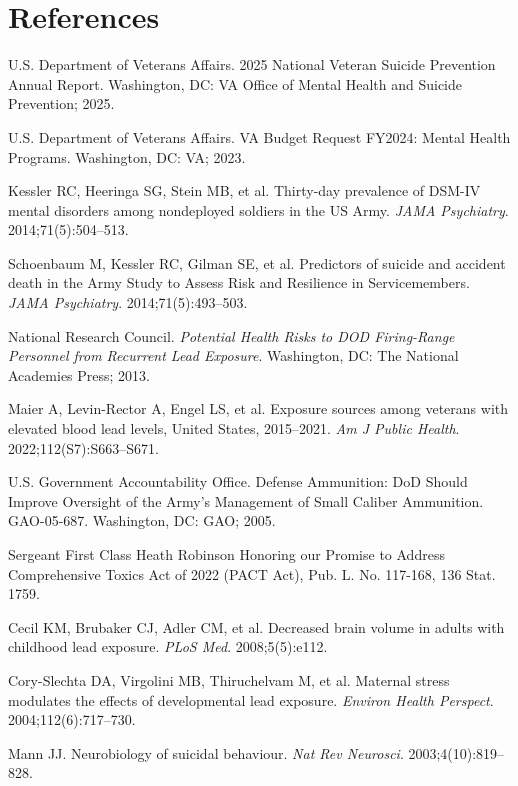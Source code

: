 \documentclass[11pt,twocolumn]{article}
\begin{document}
\section*{References}
{\small
\begin{enumerate}[label={[\arabic*]}, leftmargin=*, itemsep=1pt]
    \item U.S. Department of Veterans Affairs. 2025 National Veteran Suicide Prevention Annual Report. Washington, DC: VA Office of Mental Health and Suicide Prevention; 2025.
    \item U.S. Department of Veterans Affairs. VA Budget Request FY2024: Mental Health Programs. Washington, DC: VA; 2023.
    \item Kessler RC, Heeringa SG, Stein MB, et al. Thirty-day prevalence of DSM-IV mental disorders among nondeployed soldiers in the US Army. \textit{JAMA Psychiatry}. 2014;71(5):504--513.
    \item Schoenbaum M, Kessler RC, Gilman SE, et al. Predictors of suicide and accident death in the Army Study to Assess Risk and Resilience in Servicemembers. \textit{JAMA Psychiatry}. 2014;71(5):493--503.
    \item National Research Council. \textit{Potential Health Risks to DOD Firing-Range Personnel from Recurrent Lead Exposure}. Washington, DC: The National Academies Press; 2013.
    \item Maier A, Levin-Rector A, Engel LS, et al. Exposure sources among veterans with elevated blood lead levels, United States, 2015--2021. \textit{Am J Public Health}. 2022;112(S7):S663--S671.
    \item U.S. Government Accountability Office. Defense Ammunition: DoD Should Improve Oversight of the Army's Management of Small Caliber Ammunition. GAO-05-687. Washington, DC: GAO; 2005.
    \item Sergeant First Class Heath Robinson Honoring our Promise to Address Comprehensive Toxics Act of 2022 (PACT Act), Pub. L. No. 117-168, 136 Stat. 1759.
    \item Cecil KM, Brubaker CJ, Adler CM, et al. Decreased brain volume in adults with childhood lead exposure. \textit{PLoS Med}. 2008;5(5):e112.
    \item Cory-Slechta DA, Virgolini MB, Thiruchelvam M, et al. Maternal stress modulates the effects of developmental lead exposure. \textit{Environ Health Perspect}. 2004;112(6):717--730.
    \item Mann JJ. Neurobiology of suicidal behaviour. \textit{Nat Rev Neurosci}. 2003;4(10):819--828.

\end{enumerate}}
\end{document}
